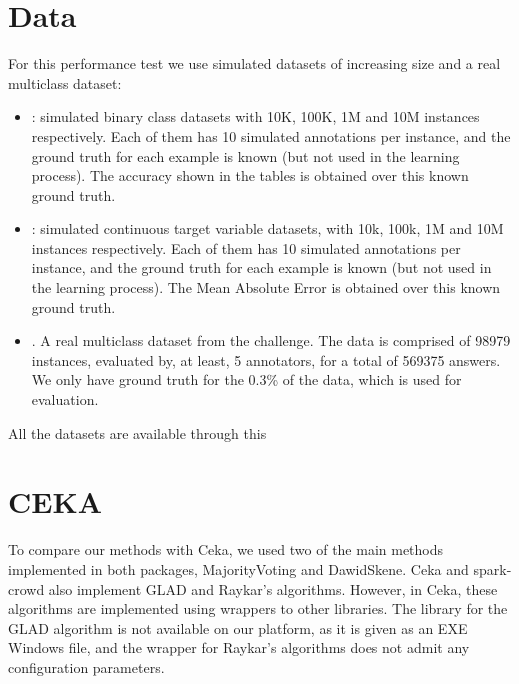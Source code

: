 \documentclass[letterpaper,10pt,english]{sphinxmanual}
\begin{document}
\section{Data}
\label{\detokenize{package/other:data}}
For this performance test we use simulated datasets of increasing size and a real multiclass dataset:
\begin{itemize}
\item {} 
: simulated binary class datasets with 10K, 100K, 1M and 10M instances respectively. Each of them
has 10 simulated annotations per instance, and the ground truth for each example is known (but not used in the
learning process). The accuracy shown in the tables is obtained over this known ground truth.

\item {} 
: simulated continuous target variable datasets, with 10k, 100k, 1M and 10M instances respectively. Each of them
has 10 simulated annotations per instance, and the ground truth for each example is known (but not used in the
learning process). The Mean Absolute Error is obtained over this known ground truth.

\item {} 
. A real multiclass dataset from the  challenge. The data is comprised of 98979 instances,
evaluated by, at least, 5 annotators, for a total of 569375 answers. We only have ground truth for the 0.3\% of the data,
which is used for evaluation.

\end{itemize}

All the datasets are available through this 


\section{CEKA}
\label{\detokenize{package/other:id1}}
To compare our methods with Ceka, we used two of the main methods implemented in both packages, MajorityVoting and DawidSkene. Ceka and
spark-crowd also implement GLAD and Raykar’s algorithms. However, in Ceka, these algorithms are implemented using wrappers to other libraries.
The library for the GLAD algorithm is not available on our platform, as it is given as an EXE Windows file, and the wrapper for Raykar’s algorithms
does not admit any configuration parameters.
\end{document}
